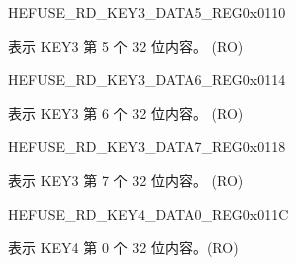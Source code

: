 \begin{register}{H}{EFUSE\_RD\_KEY3\_DATA5\_REG}{0x{}0110}\label{regdesc:EFUSERDKEY3DATA5REG}
%
\regnewline%
\begin{regdesc}\begin{reglist}
\label{fielddesc:EFUSEKEY3DATA5}\item [EFUSE\_KEY3\_DATA5] 表示 KEY3 第 5 个 32 位内容。 (RO)
\end{reglist}\end{regdesc}
\end{register}


\begin{register}{H}{EFUSE\_RD\_KEY3\_DATA6\_REG}{0x{}0114}\label{regdesc:EFUSERDKEY3DATA6REG}
%
\regnewline%
\begin{regdesc}\begin{reglist}
\label{fielddesc:EFUSEKEY3DATA6}\item [EFUSE\_KEY3\_DATA6] 表示 KEY3 第 6 个 32 位内容。 (RO)
\end{reglist}\end{regdesc}
\end{register}


\begin{register}{H}{EFUSE\_RD\_KEY3\_DATA7\_REG}{0x{}0118}\label{regdesc:EFUSERDKEY3DATA7REG}
%
\regnewline%
\begin{regdesc}\begin{reglist}
\label{fielddesc:EFUSEKEY3DATA7}\item [EFUSE\_KEY3\_DATA7] 表示 KEY3 第 7 个 32 位内容。 (RO)
\end{reglist}\end{regdesc}
\end{register}


\begin{register}{H}{EFUSE\_RD\_KEY4\_DATA0\_REG}{0x{}011C}\label{regdesc:EFUSERDKEY4DATA0REG}
%
\regnewline%
\begin{regdesc}\begin{reglist}
\label{fielddesc:EFUSEKEY4DATA0}\item [EFUSE\_KEY4\_DATA0] 表示 KEY4 第 0 个 32 位内容。(RO)
\end{reglist}\end{regdesc}
\end{register}


